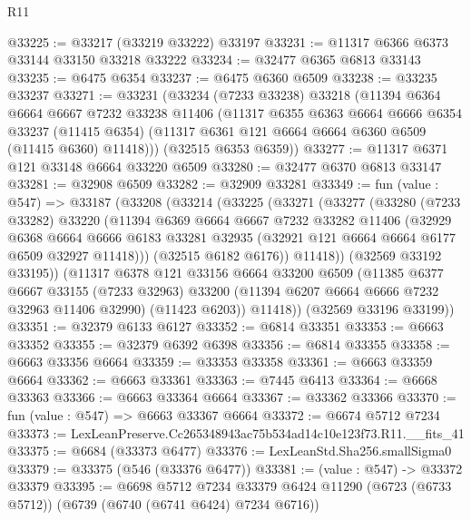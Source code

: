 \begin{lexlean}{R11}
\begin{coremodule}
@33225 := @33217 (@33219 @33222) @33197
@33231 := @11317 @6366 @6373 @33144 @33150 @33218 @33222
@33234 := @32477 @6365 @6813 @33143
@33235 := @6475 @6354
@33237 := @6475 @6360 @6509
@33238 := @33235 @33237
@33271 := @33231
    (@33234
      (@7233 @33238)
      @33218
      (@11394
        @6364
        @6664
        @6667
        @7232
        @33238
        @11406
        (@11317
          @6355
          @6363
          @6664
          @6666
          @6354
          @33237
          (@11415 @6354)
          (@11317 @6361 @121 @6664 @6664 @6360 @6509 (@11415 @6360) @11418)))
      (@32515 @6353 @6359))
@33277 := @11317 @6371 @121 @33148 @6664 @33220 @6509
@33280 := @32477 @6370 @6813 @33147
@33281 := @32908 @6509
@33282 := @32909 @33281
@33349 := fun (value : @547) =>
  @33187
    (@33208
      (@33214
        (@33225
          (@33271
            (@33277
              (@33280
                (@7233 @33282)
                @33220
                (@11394
                  @6369
                  @6664
                  @6667
                  @7232
                  @33282
                  @11406
                  (@32929
                    @6368
                    @6664
                    @6666
                    @6183
                    @33281
                    @32935
                    (@32921 @121 @6664 @6664 @6177 @6509 @32927 @11418)))
                (@32515 @6182 @6176))
              @11418))
          (@32569 @33192 @33195))
        (@11317
          @6378
          @121
          @33156
          @6664
          @33200
          @6509
          (@11385
            @6377
            @6667
            @33155
            (@7233 @32963)
            @33200
            (@11394 @6207 @6664 @6666 @7232 @32963 @11406 @32990)
            (@11423 @6203))
          @11418))
      (@32569 @33196 @33199))
@33351 := @32379 @6133 @6127
@33352 := @6814 @33351
@33353 := @6663 @33352
@33355 := @32379 @6392 @6398
@33356 := @6814 @33355
@33358 := @6663 @33356 @6664
@33359 := @33353 @33358
@33361 := @6663 @33359 @6664
@33362 := @6663 @33361
@33363 := @7445 @6413
@33364 := @6668 @33363
@33366 := @6663 @33364 @6664
@33367 := @33362 @33366
@33370 := fun (value : @547) => @6663 @33367 @6664
@33372 := @6674 @5712 @7234
@33373 := LexLeanPreserve.Cc265348943ac75b534ad14c10e123f73.R11.__fits_41
@33375 := @6684 (@33373 @6477)
@33376 := LexLeanStd.Sha256.smallSigma0
@33379 := @33375 (@546 (@33376 @6477))
@33381 := (value : @547) -> @33372 @33379
@33395 := @6698
    @5712
    @7234
    @33379
    @6424
    @11290
    (@6723 (@6733 @5712))
    (@6739 (@6740 (@6741 @6424) @7234 @6716))

\end{coremodule}
\end{lexlean}
